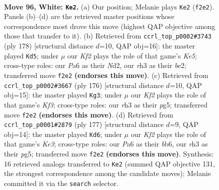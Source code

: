\documentclass[11pt]{article}
\begin{document}
\clearpage

\begin{figure}[p]\centering
\begin{subfigure}{0.46\textwidth}\centering
\resizebox{\linewidth}{!}{%
\newchessgame
\chessboard[
  setfen={8/3k4/PR2n3/8/8/7r/5K2/8 w - - 19 96},
  showmover=false,
  pgfstyle=straightmove, color=movearrow, markmove={f2-e2}
]}
\caption{}
\end{subfigure}\hfill
\begin{subfigure}{0.46\textwidth}\centering
\resizebox{\linewidth}{!}{%
\newchessgame
\chessboard[
  setfen={8/n7/1k6/4K3/8/8/R2Nb3/8 w - - 41 90},
  showmover=false,
  pgfstyle=straightmove, color=movearrow, markmove={e5-d5}
]}
\caption{}
\end{subfigure}
\\[4pt]
\begin{subfigure}{0.46\textwidth}\centering
\resizebox{\linewidth}{!}{%
\newchessgame
\chessboard[
  setfen={3R4/8/3nk3/6p1/6P1/5K2/8/8 w - - 35 89},
  showmover=false,
  pgfstyle=straightmove, color=movearrow, markmove={f3-g3}
]}
\caption{}
\end{subfigure}\hfill
\begin{subfigure}{0.46\textwidth}\centering
\resizebox{\linewidth}{!}{%
\newchessgame
\chessboard[
  setfen={8/8/1B2k3/6P1/2r4N/6K1/8/8 b - - 8 89},
  showmover=false,
  pgfstyle=straightmove, color=movearrow, markmove={e6-d6}
]}
\caption{}
\end{subfigure}
\caption{\textbf{Move 96, White: \texttt{Ke2}.} (a) Our position; Melanie plays \texttt{Ke2} (\texttt{f2e2}). Panels (b)--(d) are the retrieved master positions whose correspondence most drove this move (highest QAP objective among those that transfer to it). (b) Retrieved from \texttt{ccrl\_top\_p0002\#3743} (ply 178) [structural distance $d$=10, QAP obj=16]: the master played \texttt{Kd5}; under $\mu$ our \emph{Kf2} plays the role of that game's \emph{Ke5}; cross-type roles: our \emph{P}a6 as their \emph{N}d2, our \emph{r}h3 as their \emph{b}e2; transferred move \texttt{f2e2} \textbf{(endorses this move)}. (c) Retrieved from \texttt{ccrl\_top\_p0002\#3667} (ply 176) [structural distance $d$=10, QAP obj=15]: the master played \texttt{Kg3}; under $\mu$ our \emph{Kf2} plays the role of that game's \emph{Kf3}; cross-type roles: our \emph{r}h3 as their \emph{p}g5; transferred move \texttt{f2e2} \textbf{(endorses this move)}. (d) Retrieved from \texttt{ccrl\_top\_p0001\#2879} (ply 177) [structural distance $d$=9, QAP obj=14]: the master played \texttt{Kd6}; under $\mu$ our \emph{Kf2} plays the role of that game's \emph{Ke3}; cross-type roles: our \emph{P}a6 as their \emph{b}b6, our \emph{r}h3 as their \emph{p}g5; transferred move \texttt{f2e2} \textbf{(endorses this move)}. Synthesis: 16 retrieved analogs transferred to \texttt{Ke2} (summed QAP objective 131, the strongest correspondence among the candidate moves); Melanie committed it via the \texttt{search} selector.}
\label{fig:thought-m190}
\end{figure}
\end{document}
